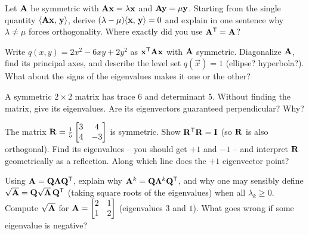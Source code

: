 \begin{exercise}
\label{ch26:ex-ortho-proof}
Let $\mathbf{A}$ be symmetric with $\mathbf{A}\mathbf{x}=\lambda\mathbf{x}$ and
$\mathbf{A}\mathbf{y}=\mu\mathbf{y}$. Starting from the single quantity
$\langle \mathbf{A}\mathbf{x},\, \mathbf{y} \rangle$, derive $(\lambda-\mu)\langle \mathbf{x},\, \mathbf{y} \rangle=0$
and explain in one sentence why $\lambda\neq\mu$ forces orthogonality. Where
exactly did you use $\mathbf{A}^{\mathsf{T}}=\mathbf{A}$?
\end{exercise}

\begin{exercise}
\label{ch26:ex-quadform}
Write $q(x,y)=2x^2 - 6xy + 2y^2$ as $\mathbf{x}^{\mathsf{T}}\mathbf{A}\mathbf{x}$ with $\mathbf{A}$
symmetric. Diagonalize $\mathbf{A}$, find its principal axes, and describe the level
set $q(\vec{x})=1$ (ellipse? hyperbola?). What about the signs of the eigenvalues
makes it one or the other?
\end{exercise}

\begin{exercise}
\label{ch26:ex-trace}
A symmetric $2\times 2$ matrix has trace $6$ and determinant $5$. Without finding
the matrix, give its eigenvalues. Are its eigenvectors guaranteed perpendicular?
Why?
\end{exercise}

\begin{exercise}
\label{ch26:ex-reflection-ex}
The matrix $\mathbf{R}=\frac{1}{5}\begin{bmatrix}3&4\\4&-3\end{bmatrix}$ is symmetric.
Show $\mathbf{R}^{\mathsf{T}}\mathbf{R}=\mathbf{I}$ (so $\mathbf{R}$ is also orthogonal). Find its
eigenvalues -- you should get $+1$ and $-1$ -- and interpret $\mathbf{R}$ geometrically
as a reflection. Along which line does the $+1$ eigenvector point?
\end{exercise}

\begin{exercise}
\label{ch26:ex-function}
Using $\mathbf{A}=\mathbf{Q}\mathbf{\Lambda}\mathbf{Q}^{\mathsf{T}}$, explain why
$\mathbf{A}^k=\mathbf{Q}\mathbf{\Lambda}^k\mathbf{Q}^{\mathsf{T}}$, and why one may sensibly define
$\sqrt{\mathbf{A}}=\mathbf{Q}\sqrt{\mathbf{\Lambda}}\,\mathbf{Q}^{\mathsf{T}}$ (taking square roots of the
eigenvalues) when all $\lambda_k\ge 0$. Compute $\sqrt{\mathbf{A}}$ for
$\mathbf{A}=\begin{bmatrix}2&1\\1&2\end{bmatrix}$ (eigenvalues $3$ and $1$). What goes
wrong if some eigenvalue is negative?
\end{exercise}

